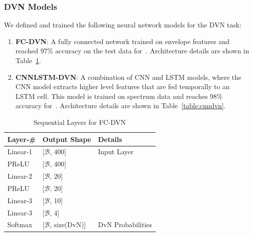 \documentclass[\main/thesis.tex]{subfiles}
\begin{document}
\subsubsection{DVN Models}
\label{sec:dvn_arch}
We defined and trained the following neural network models for the DVN task:
\begin{enumerate}
\item \textbf{FC-DVN}: A fully connected network trained on envelope features and reached 97\% accuracy on the test data for~\decfirst. Architecture details are shown in Table~\ref{table:FCDVN}.
\item \textbf{CNNLSTM-DVN}: A combination of CNN and LSTM models, where the CNN model extracts higher level features that are fed temporally to an LSTM cell. This model is trained on spectrum data and reaches 98\% accuracy for~\decfirst. Architecture details are shown in Table~\ref{table:cnndvn}.
\end{enumerate}

\begin{center}
    \begin{table}[tbp]
    \centering
    \begin{tabular}{|p{33mm}|p{33mm}|p{50mm}|}
    
    \hline
    Layer-\# & Output Shape &  Details  \\ 
    	\hline
    Linear-1 & [$\mathcal{B}$, 400] &   Input Layer  \\ 
    	\hline
    PReLU & [$\mathcal{B}$, 400] &  \\ 
    	\hline
    Linear-2 & [$\mathcal{B}$, 20] & \\ 
    	\hline
    PReLU & [$\mathcal{B}$, 20] &  \\ 
    	\hline 
    Linear-3 & [$\mathcal{B}$, 10] &  \\ 
    	\hline
    Linear-3 & [$\mathcal{B}$, 4] &  \\ 
    	\hline 
    Softmax & [$\mathcal{B}$, size(DvN)] &  DvN Probabilities\\ 
    	\hline
    \end{tabular}

    \caption{Sequential Layers for FC-DVN}
    \label{table:FCDVN}    
    \end{table}
\end{center}
\end{document}
